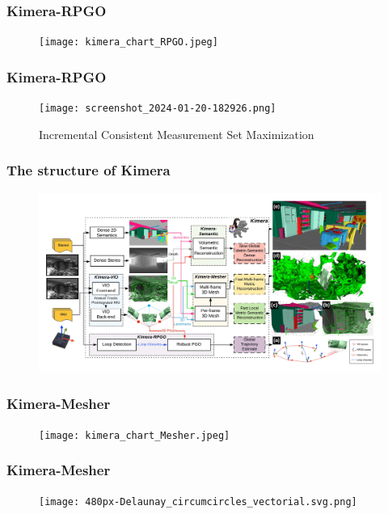 \documentclass[11pt]{beamer}
\begin{document}
\begin{frame}
    \frametitle{Kimera-RPGO} 
\begin{figure}
    \texttt{[image: kimera\_chart\_RPGO.jpeg]} 
\end{figure}
\end{frame}
\begin{frame}
    \frametitle{Kimera-RPGO} 
\begin{figure}
    \texttt{[image: screenshot\_2024-01-20-182926.png]} 
    \caption{Incremental
    Consistent Measurement Set Maximization \cite{PCM}}
\end{figure}
\end{frame}
\begin{frame}
\frametitle{The structure of Kimera}
\begin{figure}
    \includegraphics[width=\linewidth]{kimera_chart_23.jpeg} 
\end{figure}
\end{frame}
\begin{frame}
\frametitle{Kimera-Mesher}
\begin{figure}
    \texttt{[image: kimera\_chart\_Mesher.jpeg]} 
\end{figure}
\end{frame}
\begin{frame}
\frametitle{Kimera-Mesher}
\begin{minipage}{0.49\textwidth}
    \begin{figure}
        \texttt{[image: 480px-Delaunay\_circumcircles\_vectorial.svg.png]} 
    \end{figure}
\end{minipage}
\begin{minipage}{0.49\textwidth}
    \begin{figure}[ht]
        \centering
    \end{figure}
\end{minipage}
\end{frame}
\end{document}
